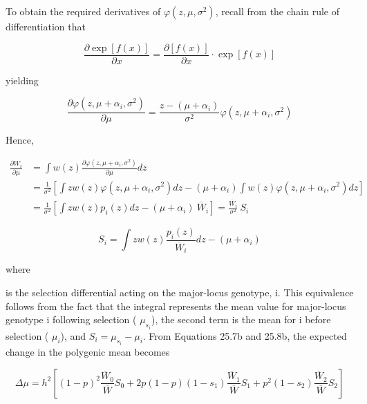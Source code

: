 \documentclass{article}
\begin{document}
To obtain the required derivatives of  $ \varphi(z,\mu,\sigma^{2}) $, recall from the chain rule of differentiation that

\begin{equation}
\frac{\partial\exp[f(x)]}{\partial x}=\frac{\partial[f(x)]}{\partial x}\cdot\exp[f(x)]
\end{equation}

yielding

\begin{equation}
\frac{\partial\varphi(z,\mu+\alpha_{i},\sigma^{2})}{\partial\mu}=\frac{z-(\mu+\alpha_{i})}{\sigma^{2}}\varphi(z,\mu+\alpha_{i},\sigma^{2})
\tag{25.8a}
\label{eq:25_8a}
\end{equation}

Hence,

\begin{equation}
\begin{aligned}\frac{\partial W_{i}}{\partial\mu}&=\int w(z)\frac{\partial\varphi(z,\mu+\alpha_{i},\sigma^{2})}{\partial\mu}dz\\&=\frac{1}{\sigma^{2}}\left[\int z w(z)\varphi(z,\mu+\alpha_{i},\sigma^{2})dz-(\mu+\alpha_{i})\int w(z)\varphi(z,\mu+\alpha_{i},\sigma^{2})dz\right]\\&=\frac{1}{\sigma^{2}}\left[\int z w(z)p_{i}(z)dz-(\mu+\alpha_{i})\ \overline{W}_{i}\right]=\frac{\overline{W}_{i}}{\sigma^{2}}\ S_{i}\end{aligned}
\tag{25.8b}
\label{eq:25_8b}
\end{equation}

\begin{equation}
S_{i}=\int z w(z)\frac{p_{i}(z)}{\overline{W}_{i}}d z-(\mu+\alpha_{i})
\tag{25.8c}
\label{eq:25_8c}
\end{equation}

where

is the selection differential acting on the major-locus genotype, i. This equivalence follows from the fact that the integral represents the mean value for major-locus genotype i following selection ( $ \mu_{s_i} $), the second term is the mean for i before selection ( $ \mu_i $), and  $ S_i = \mu_{s_i} - \mu_i $. From Equations 25.7b and 25.8b, the expected change in the polygenic mean becomes

\begin{equation}
\Delta\mu=h^{2}\left[(1-p)^{2}\frac{\overline{W}_{0}}{\overline{W}}S_{0}+2p(1-p)(1-s_{1})\frac{\overline{W}_{1}}{\overline{W}}S_{1}+p^{2}(1-s_{2})\frac{\overline{W}_{2}}{\overline{W}}S_{2}\right]
\tag{25.8d}
\label{eq:25_8d}
\end{equation}
\end{document}
